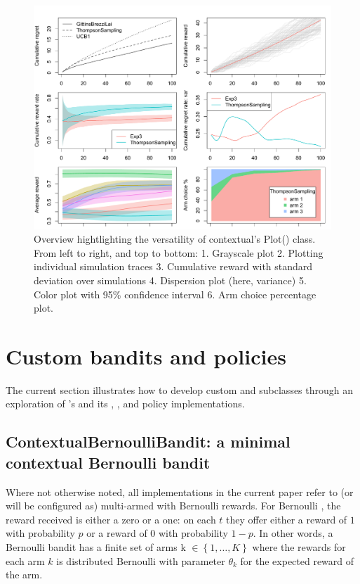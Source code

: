 \documentclass{jss}
\begin{document}
\begin{figure}[H]
\centering
\includegraphics[width=.99\textwidth]{fig/section_4_2_plot}
\caption{Overview hightlighting the versatility of contextual's Plot() class. From left to right, and top to bottom: 1. Grayscale plot 2. Plotting individual simulation traces 3. Cumulative reward with standard deviation over simulations 4. Dispersion plot (here, variance) 5. Color plot with 95\% confidence interval 6. Arm choice percentage plot. }
\label{fig:section_4_2_plot}
\end{figure}

\section{Custom bandits and policies} \label{extending}

The current section illustrates how to develop custom  and  subclasses through an exploration of 's  and its , , and  policy implementations.

\subsection{ContextualBernoulliBandit: a minimal contextual Bernoulli bandit} \label{ContextualBernoulliBandit}

Where not otherwise noted, all  implementations in the current paper refer to (or will be configured as) multi-armed  with Bernoulli rewards. For Bernoulli , the reward received is either a zero or a one: on each $t$ they offer either a reward of $1$ with probability $p$ or a reward of $0$ with probability $1 - p$. In other words, a Bernoulli bandit has a finite set of arms k \(  \in \left\{ 1, \dots, K \right\} \) where the rewards for each arm $k$ is distributed Bernoulli with parameter $\theta_k$ for the expected reward of the arm.
\end{document}
